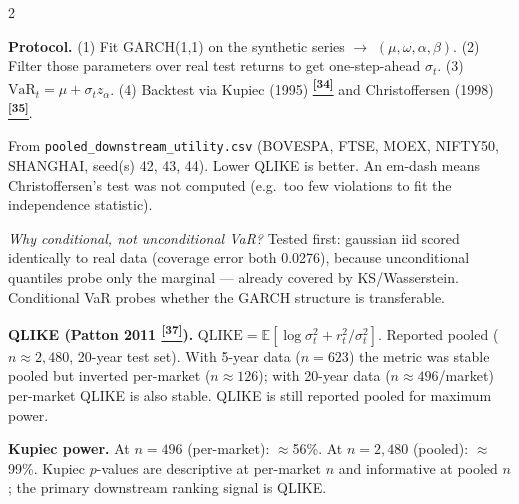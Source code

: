 \documentclass[10pt]{article}
\newcommand{\tcite}[1]{%
  \hyperlink{R:#1}{\textsuperscript{\scriptsize\textbf{[#1]}}}}
\newcommand{\E}{\mathbb{E}}
\begin{document}
\begin{multicols}{2}
{\textbf{Protocol.} (1) Fit GARCH(1,1) on the synthetic series $\to$ $(\mu, \omega, \alpha, \beta)$. (2) Filter those parameters over real test returns to get one-step-ahead $\sigma_t$. (3) $\text{VaR}_t = \mu + \sigma_t z_\alpha$. (4) Backtest via Kupiec (1995)\tcite{34} and Christoffersen (1998)\tcite{35}.

\smallskip
{}

\smallskip
{\small From \texttt{pooled\_downstream\_utility.csv} (BOVESPA, FTSE, MOEX, NIFTY50, SHANGHAI, seed(s) 42, 43, 44). Lower QLIKE is better. An em-dash means Christoffersen's test was not computed (e.g.\ too few violations to fit the independence statistic).}

\textit{Why conditional, not unconditional VaR?} Tested first: gaussian iid scored identically to real data (coverage error both 0.0276), because unconditional quantiles probe only the marginal --- already covered by KS/Wasserstein. Conditional VaR probes whether the GARCH structure is transferable.

\textbf{QLIKE (Patton 2011\tcite{37}).} $\text{QLIKE} = \E[\log\sigma_t^2 + r_t^2/\sigma_t^2]$. Reported pooled ($n\approx2{,}480$, 20-year test set). With 5-year data ($n=623$) the metric was stable pooled but inverted per-market ($n\approx126$); with 20-year data ($n\approx496$/market) per-market QLIKE is also stable. QLIKE is still reported pooled for maximum power.

\textbf{Kupiec power.} At $n=496$ (per-market): $\approx$56\%. At $n=2{,}480$ (pooled): $\approx$99\%. Kupiec $p$-values are descriptive at per-market $n$ and informative at pooled $n$; the primary downstream ranking signal is QLIKE.

}
\end{multicols}
\end{document}
